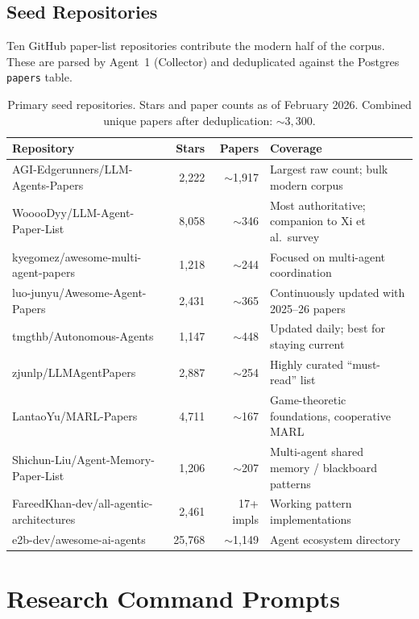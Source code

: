 \documentclass{article}
\begin{document}
\subsection{Seed Repositories}

Ten GitHub paper-list repositories contribute the modern half of the corpus. These
are parsed by Agent~1 (Collector) and deduplicated against the Postgres
\texttt{papers} table.

\begin{table}[h]
\centering
\caption{Primary seed repositories. Stars and paper counts as of February 2026.
Combined unique papers after deduplication: ${\sim}3{,}300$.}
\label{tab:seed-repos}
\footnotesize
\begin{tabular}{@{} p{5.5cm} r r p{5cm} @{}}
\toprule
\textbf{Repository} & \textbf{Stars} & \textbf{Papers} & \textbf{Coverage} \\
\midrule
AGI-Edgerunners/LLM-Agents-Papers & 2,222 & ${\sim}$1,917 & Largest raw count; bulk modern corpus \\
WooooDyy/LLM-Agent-Paper-List & 8,058 & ${\sim}$346 & Most authoritative; companion to Xi et al.\ survey \\
kyegomez/awesome-multi-agent-papers & 1,218 & ${\sim}$244 & Focused on multi-agent coordination \\
luo-junyu/Awesome-Agent-Papers & 2,431 & ${\sim}$365 & Continuously updated with 2025--26 papers \\
tmgthb/Autonomous-Agents & 1,147 & ${\sim}$448 & Updated daily; best for staying current \\
zjunlp/LLMAgentPapers & 2,887 & ${\sim}$254 & Highly curated ``must-read'' list \\
LantaoYu/MARL-Papers & 4,711 & ${\sim}$167 & Game-theoretic foundations, cooperative MARL \\
Shichun-Liu/Agent-Memory-Paper-List & 1,206 & ${\sim}$207 & Multi-agent shared memory / blackboard patterns \\
FareedKhan-dev/all-agentic-architectures & 2,461 & 17+ impls & Working pattern implementations \\
e2b-dev/awesome-ai-agents & 25,768 & ${\sim}$1,149 & Agent ecosystem directory \\
\bottomrule
\end{tabular}
\end{table}

\section{Research Command Prompts}
\label{app:commands}
\end{document}
